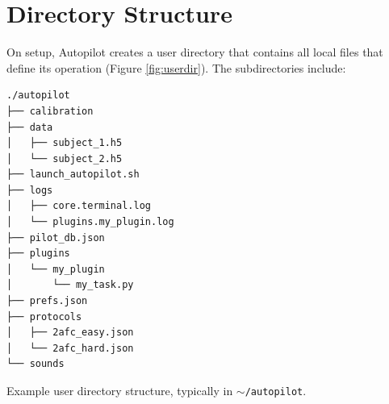 \section{Directory Structure}
\label{sec:userdir}

On setup, Autopilot creates a user directory that contains all local files that define its operation (Figure \ref{fig:userdir}). The subdirectories include:

\begin{marginfigure}[3cm]
\begin{verbatim}
./autopilot
├── calibration
├── data
│   ├── subject_1.h5
│   └── subject_2.h5
├── launch_autopilot.sh
├── logs
│   ├── core.terminal.log
│   └── plugins.my_plugin.log
├── pilot_db.json
├── plugins
│   └── my_plugin
│       └── my_task.py
├── prefs.json
├── protocols
│   ├── 2afc_easy.json
│   └── 2afc_hard.json
└── sounds
\end{verbatim}
\caption{Example user directory structure, typically in \texttt{$\sim$/autopilot}.}
\label{fig:userdir}
\end{marginfigure}

